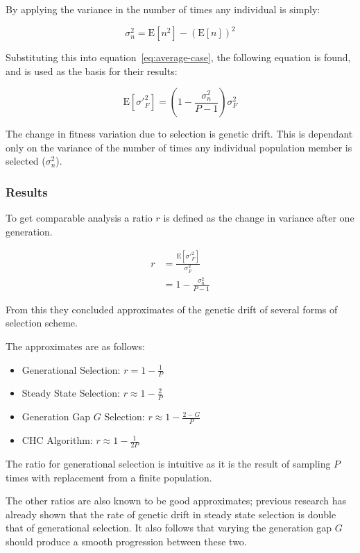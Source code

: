 \documentclass[10pt, a4paper]{article}
\begin{document}
By applying the variance in the number of times any individual is simply:

\begin{equation}
\sigma^2_n = \text{E}[n^2] - (\text{E}[n])^2
\end{equation}

Substituting this into equation~\ref{eq:average-case}, the following equation
is found, and is used as the basis for their results:

\begin{equation}
\text{E}[\sigma'^2_F] = \left( 1 - \frac{\sigma^2_n}{P-1}\right) \sigma^2_F
\end{equation}

The change in fitness variation due to selection is genetic drift. This is
dependant only on the variance of the number of times any individual population
member is selected ($\sigma^2_n$).

\subsubsection{Results} 
To get comparable analysis a ratio $r$ is defined as the change in variance 
after one generation.

\begin{align}
r &= \frac{\text{E}[\sigma'^2_F]}{\sigma^2_F} \\
  &= 1-\frac{\sigma^2_n}{P-1}
\end{align}

From this they concluded approximates of the genetic drift of several forms of
selection scheme.


The approximates are as follows:

\begin{itemize}
\item Generational Selection: $r = 1 - \frac{1}{P}$
\item Steady State Selection: $r \approx 1 - \frac{2}{P}$
\item Generation Gap $G$ Selection: $r \approx 1 - \frac{2 - G}{P}$
\item CHC Algorithm: $r \approx 1 - \frac{1}{2P}$
\end{itemize}

The ratio for generational selection is intuitive as it is the result of
sampling $P$ times with replacement from a finite population.

The other ratios are also known to be good approximates; previous 
research \cite{rogers1999modelling}
has already shown that the rate of genetic drift in steady state selection is
double that of generational selection. It also follows that varying the
generation gap $G$ should produce a smooth progression between these two.
\end{document}
